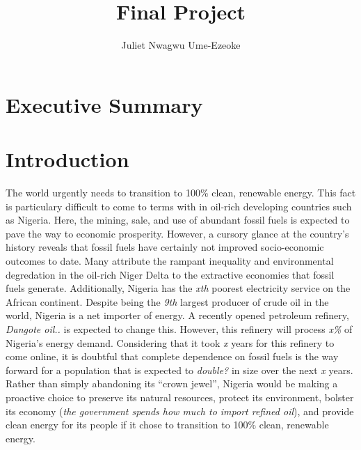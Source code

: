 \documentclass[
  letterpaper,
  DIV=11,
  numbers=noendperiod]{scrartcl}
\title{Final Project}
\author{Juliet Nwagwu Ume-Ezeoke}
\date{}
\renewcommand*\contentsname{Table of contents}
\newcommand\contentsname{Table of contents}
\begin{document}
\maketitle
\ifdefined\Shaded\renewenvironment{Shaded}{\begin{tcolorbox}[frame hidden, sharp corners, borderline west={3pt}{0pt}{shadecolor}, boxrule=0pt, breakable, enhanced, interior hidden]}{\end{tcolorbox}}\fi

\renewcommand*\contentsname{Table of contents}
{
\hypersetup{linkcolor=}
\setcounter{tocdepth}{3}
\tableofcontents
}
\hypertarget{executive-summary}{%
\section{Executive Summary}\label{executive-summary}}

\hypertarget{introduction}{%
\section{Introduction}\label{introduction}}

The world urgently needs to transition to 100\% clean, renewable energy.
This fact is particulary difficult to come to terms with in oil-rich
developing countries such as Nigeria. Here, the mining, sale, and use of
abundant fossil fuels is expected to pave the way to economic
prosperity. However, a cursory glance at the country's history reveals
that fossil fuels have certainly not improved socio-economic outcomes to
date. Many attribute the rampant inequality and environmental
degredation in the oil-rich Niger Delta to the extractive economies that
fossil fuels generate. Additionally, Nigeria has the \emph{xth} poorest
electricity service on the African continent. Despite being the
\emph{9th} largest producer of crude oil in the world, Nigeria is a net
importer of energy. A recently opened petroleum refinery, \emph{Dangote
oil..} is expected to change this. However, this refinery will process
\emph{x\%} of Nigeria's energy demand. Considering that it took \emph{x}
years for this refinery to come online, it is doubtful that complete
dependence on fossil fuels is the way forward for a population that is
expected to \emph{double?} in size over the next \emph{x} years. Rather
than simply abandoning its ``crown jewel'', Nigeria would be making a
proactive choice to preserve its natural resources, protect its
environment, bolster its economy (\emph{the government spends how much
to import refined oil}), and provide clean energy for its people if it
chose to transition to 100\% clean, renewable energy.
\end{document}
